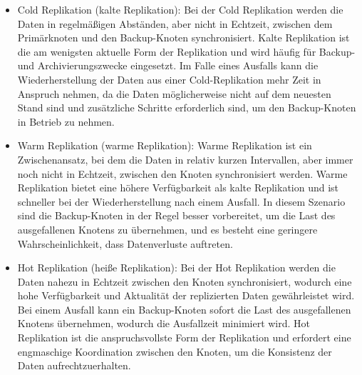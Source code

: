 \documentclass[../vs-script-first-v01.tex]{subfiles}
\begin{document}
\begin{itemize}
\item Cold Replikation (kalte Replikation): Bei der Cold Replikation werden die Daten in regelmäßigen Abständen, aber nicht in Echtzeit, zwischen dem Primärknoten und den Backup-Knoten synchronisiert. Kalte Replikation ist die am wenigsten aktuelle Form der Replikation und wird häufig für Backup- und Archivierungszwecke eingesetzt. Im Falle eines Ausfalls kann die Wiederherstellung der Daten aus einer Cold-Replikation mehr Zeit in Anspruch nehmen, da die Daten möglicherweise nicht auf dem neuesten Stand sind und zusätzliche Schritte erforderlich sind, um den Backup-Knoten in Betrieb zu nehmen.
\item Warm Replikation (warme Replikation): Warme Replikation ist ein Zwischenansatz, bei dem die Daten in relativ kurzen Intervallen, aber immer noch nicht in Echtzeit, zwischen den Knoten synchronisiert werden. Warme Replikation bietet eine höhere Verfügbarkeit als kalte Replikation und ist schneller bei der Wiederherstellung nach einem Ausfall. In diesem Szenario sind die Backup-Knoten in der Regel besser vorbereitet, um die Last des ausgefallenen Knotens zu übernehmen, und es besteht eine geringere Wahrscheinlichkeit, dass Datenverluste auftreten.
\item Hot Replikation (heiße Replikation): Bei der Hot Replikation werden die Daten nahezu in Echtzeit zwischen den Knoten synchronisiert, wodurch eine hohe Verfügbarkeit und Aktualität der replizierten Daten gewährleistet wird. Bei einem Ausfall kann ein Backup-Knoten sofort die Last des ausgefallenen Knotens übernehmen, wodurch die Ausfallzeit minimiert wird. Hot Replikation ist die anspruchsvollste Form der Replikation und erfordert eine engmaschige Koordination zwischen den Knoten, um die Konsistenz der Daten aufrechtzuerhalten.
\end{itemize}
\end{document}
